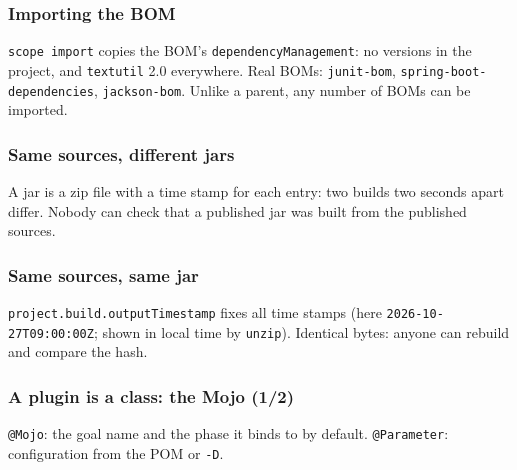 \documentclass[aspectratio=169,10pt,compress]{beamer}
\begin{document}
\begin{frame}[t,fragile] \frametitle{Importing the BOM}

  \vspace{0.1em}
  \small
  \texttt{scope import} copies the BOM's \texttt{dependencyManagement}: no versions in the project, and \texttt{textutil} 2.0 everywhere. Real BOMs: \texttt{junit-bom}, \texttt{spring-boot-dependencies}, \texttt{jackson-bom}. Unlike a parent, any number of BOMs can be imported.
\end{frame}





\begin{frame}[t,fragile] \frametitle{Same sources, different jars}

  \vspace{0.1em}
  \small
  A jar is a zip file with a time stamp for each entry: two builds two seconds apart differ. Nobody can check that a published jar was built from the published sources.
\end{frame}




\begin{frame}[t,fragile] \frametitle{Same sources, same jar}

  \vspace{0.1em}
  \small
  \texttt{project.build.outputTimestamp} fixes all time stamps (here \texttt{2026-10-27T09:00:00Z}; shown in local time by \texttt{unzip}). Identical bytes: anyone can rebuild and compare the hash.
\end{frame}





\begin{frame}[t,fragile] \frametitle{A plugin is a class: the Mojo (1/2)}

  \vspace{0.1em}
  \small \texttt{@Mojo}: the goal name and the phase it binds to by default. \texttt{@Parameter}: configuration from the POM or \texttt{-D}.
\end{frame}
\end{document}
